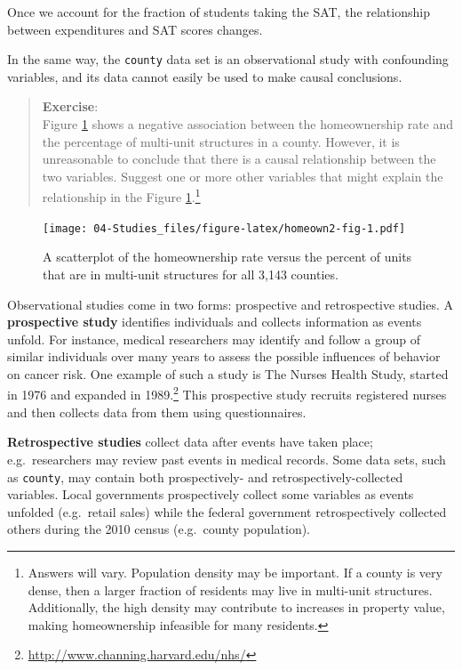 \documentclass[
]{book}
\begin{document}
Once we account for the fraction of students taking the SAT, the relationship between expenditures and SAT scores changes.

In the same way, the \texttt{county} data set is an observational study with confounding variables, and its data cannot easily be used to make causal conclusions.

\begin{quote}
\textbf{Exercise}:\\
Figure \ref{fig:homeown2-fig} shows a negative association between the homeownership rate and the percentage of multi-unit structures in a county. However, it is unreasonable to conclude that there is a causal relationship between the two variables. Suggest one or more other variables that might explain the relationship in the Figure \ref{fig:homeown2-fig}.\footnote{Answers will vary. Population density may be important. If a county is very dense, then a larger fraction of residents may live in multi-unit structures. Additionally, the high density may contribute to increases in property value, making homeownership infeasible for many residents.}
\end{quote}

\begin{figure}
\centering
\texttt{[image: 04-Studies\_files/figure-latex/homeown2-fig-1.pdf]}
\caption{\label{fig:homeown2-fig}A scatterplot of the homeownership rate versus the percent of units that are in multi-unit structures for all 3,143 counties.}
\end{figure}

Observational studies come in two forms: prospective and retrospective studies. A \textbf{prospective study} identifies individuals and collects information as events unfold. For instance, medical researchers may identify and follow a group of similar individuals over many years to assess the possible influences of behavior on cancer risk. One example of such a study is The Nurses Health Study, started in 1976 and expanded in 1989.\footnote{\url{http://www.channing.harvard.edu/nhs/}} This prospective study recruits registered nurses and then collects data from them using questionnaires.

\textbf{Retrospective studies} collect data after events have taken place; e.g.~researchers may review past events in medical records. Some data sets, such as \texttt{county}, may contain both prospectively- and retrospectively-collected variables. Local governments prospectively collect some variables as events unfolded (e.g.~retail sales) while the federal government retrospectively collected others during the 2010 census (e.g.~county population).
\end{document}
